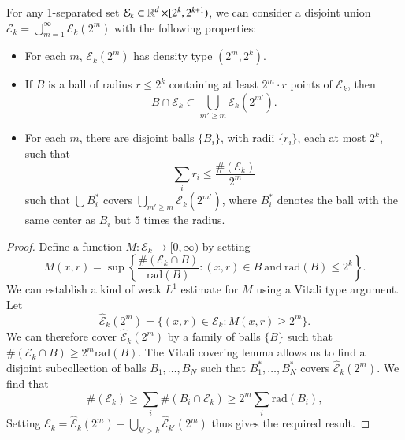 \begin{theorem} \label{DecompositionTheorem}
    For any 1-separated set $\mathcal{E}_k \subset \operatorname{\mathbb{R}}^d \times [2^k,2^{k+1})$, we can consider a disjoint union $\mathcal{E}_k = \bigcup_{m = 1}^\infty \mathcal{E}_k(2^m)$ with the following properties:
    \begin{itemize}
        \item For each $m$, $\mathcal{E}_k(2^m)$ has density type $(2^m,2^k)$.

        \item If $B$ is a ball of radius $r \leq 2^k$ containing at least $2^m \cdot r$ points of $\mathcal{E}_k$, then
        \[ B \cap \mathcal{E}_k \subset \bigcup_{m' \geq m} \mathcal{E}_k(2^{m'}). \]

        \item For each $m$, there are disjoint balls $\{ B_i \}$, with radii $\{ r_i \}$, each at most $2^k$, such that
        \[ \sum_i r_i \leq \frac{\#(\mathcal{E}_k)}{2^m} \]
        such that $\bigcup B_i^*$ covers $\bigcup_{m' \geq m} \mathcal{E}_k(2^{m'})$, where $B_i^*$ denotes the ball with the same center as $B_i$ but 5 times the radius.
    \end{itemize}
\end{theorem}
\begin{proof}
    Define a function $M: \mathcal{E}_k \to [0,\infty)$ by setting
    \[ M(x,r) = \sup \left\{ \frac{\#(\mathcal{E}_k \cap B)}{\text{rad}(B)} : (x,r) \in B\ \text{and}\ \text{rad}(B) \leq 2^k \right\}. \]
    We can establish a kind of weak $L^1$ estimate for $M$ using a Vitali type argument. Let
    \[ \widehat{\mathcal{E}}_k(2^m) = \{ (x,r) \in \mathcal{E}_k : M(x,r) \geq 2^m \}. \]
    We can therefore cover $\widehat{\mathcal{E}}_k(2^m)$ by a family of balls $\{ B \}$ such that $\#(\mathcal{E}_k \cap B) \geq 2^m \text{rad}(B)$. The Vitali covering lemma allows us to find a disjoint subcollection of balls $B_1,\dots,B_N$ such that $B_1^* ,\dots, B_N^*$ covers $\widehat{\mathcal{E}}_k(2^m)$. We find that
    \[ \#(\mathcal{E}_k) \geq \sum_i \#(B_i \cap \mathcal{E}_k) \geq 2^m \sum_i \text{rad}(B_i), \]
    Setting $\mathcal{E}_k = \widehat{\mathcal{E}}_k(2^m) - \bigcup_{k' > k} \widehat{\mathcal{E}}_{k'}(2^m)$ thus gives the required result.
\end{proof}

